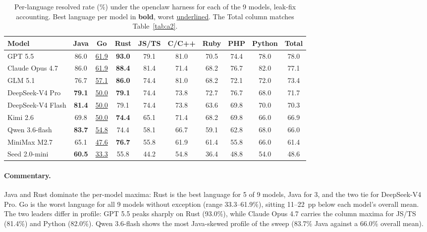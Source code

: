 \begin{table}[h]
\centering
\small
\caption{Per-language resolved rate (\%) under the openclaw harness for each of
the 9 models, leak-fix accounting. Best language per model in \textbf{bold},
worst \underline{underlined}. The Total column matches Table~\ref{tab:a2}.}
\label{tab:appG-per-lang-A}
\begin{tabular}{lcccccccc|c}
\toprule
Model & Java & Go & Rust & JS/TS & C/C++ & Ruby & PHP & Python & Total \\
\midrule
GPT 5.5           & 86.0          & \underline{61.9} & \textbf{93.0} & 79.1          & 81.0          & 70.5 & 74.4 & 78.0 & 78.0 \\
Claude Opus 4.7   & 86.0          & \underline{61.9} & \textbf{88.4} & 81.4          & 71.4          & 68.2 & 76.7 & 82.0 & 77.1 \\
GLM 5.1           & 76.7          & \underline{57.1} & \textbf{86.0} & 74.4          & 81.0          & 68.2 & 72.1 & 72.0 & 73.4 \\
DeepSeek-V4 Pro   & \textbf{79.1} & \underline{50.0} & \textbf{79.1} & 74.4          & 73.8          & 72.7 & 76.7 & 68.0 & 71.7 \\
DeepSeek-V4 Flash & \textbf{81.4} & \underline{50.0} & 79.1          & 74.4          & 73.8          & 63.6 & 69.8 & 70.0 & 70.3 \\
Kimi 2.6          & 69.8          & \underline{50.0} & \textbf{74.4} & 65.1          & 71.4          & 68.2 & 69.8 & 66.0 & 66.9 \\
Qwen 3.6-flash    & \textbf{83.7} & \underline{54.8} & 74.4          & 58.1          & 66.7          & 59.1 & 62.8 & 68.0 & 66.0 \\
MiniMax M2.7      & 65.1          & \underline{47.6} & \textbf{76.7} & 55.8          & 61.9          & 61.4 & 55.8 & 66.0 & 61.4 \\
Seed 2.0-mini     & \textbf{60.5} & \underline{33.3} & 55.8          & 44.2          & 54.8          & 36.4 & 48.8 & 54.0 & 48.6 \\
\bottomrule
\end{tabular}
\end{table}

\paragraph{Commentary.}
Java and Rust dominate the per-model maxima: Rust is the best language for 5 of
9 models, Java for 3, and the two tie for DeepSeek-V4 Pro. Go is the worst
language for all 9 models without exception (range 33.3--61.9\%), sitting
11--22~pp below each model's overall mean. The two leaders differ in profile:
GPT 5.5 peaks sharply on Rust (93.0\%), while Claude Opus 4.7 carries the
column maxima for JS/TS (81.4\%) and Python (82.0\%). Qwen 3.6-flash shows the
most Java-skewed profile of the sweep (83.7\% Java against a 66.0\% overall
mean).

